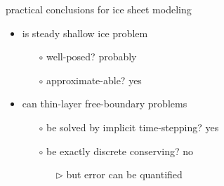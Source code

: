 \documentclass[hide notes,intlimits]{beamer}
\begin{document}
\begin{frame}{practical conclusions for ice sheet modeling}
\begin{itemize}
\item is steady shallow ice problem
  \begin{itemize}
  \item[$\circ$] well-posed? \qquad \alert{probably}
  \item[$\circ$] approximate-able? \qquad \alert{yes}
  \end{itemize}
\item can thin-layer free-boundary problems
  \begin{itemize}
  \item[$\circ$] be solved by implicit time-stepping? \qquad \alert{yes}
  \item[$\circ$] be exactly discrete conserving? \qquad \alert{no}
     \begin{itemize}
     \item[$\triangleright$] but error can be quantified
     \end{itemize}
  \end{itemize}


\end{itemize}
\end{frame}
\end{document}
